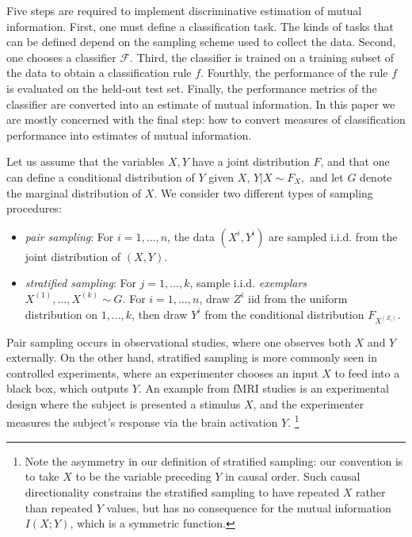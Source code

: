 \documentclass{article}
\begin{document}
Five steps are required to implement discriminative estimation of mutual information.
First, one must define a classification task.  The kinds of tasks that can be defined
depend on the sampling scheme used to collect the data.  Second,
one chooses a classifier $\mathcal{F}$.   Third, the classifier is trained on a training subset
of the data to obtain a classification rule $f$.  Fourthly, the performance of the rule $f$ is evaluated on the held-out test set.  Finally, the performance metrics of the classifier are converted into
an estimate of mutual information.  In this paper we are mostly concerned with the final step:
how to convert measures of classification performance into estimates of mutual information.

Let us assume that the variables $X, Y$ have a joint distribution $F$, and
that one can define a conditional distribution of $Y$ given $X$,
$Y|X \sim F_X,$
and let $G$ denote the marginal distribution of $X$.
We consider two different types of sampling procedures:
\begin{itemize}
\item \emph{pair sampling}:  For $i = 1,\hdots, n$, the data $(X^i, Y^i)$ are sampled i.i.d. from the joint distribution of $(X, Y)$.
\item \emph{stratified sampling}:  For $j = 1,\hdots, k$, sample i.i.d. \emph{exemplars} $X^{(1)},\hdots, X^{(k)} \sim G$.  For $i = 1,\hdots, n$, draw $Z^i$ iid from the uniform distribution on $1,\hdots, k$, then draw $Y^i$ from the conditional distribution $F_{X^{(Z_i)}}$.
\end{itemize}

Pair sampling occurs in observational studies, where one observes both $X$ and $Y$ externally.  On the other hand, stratified sampling is more commonly seen in controlled experiments, where an experimenter chooses an input $X$ to feed into a black box, which outputs $Y$.  An example from fMRI studies is an experimental design where the subject is presented a stimulus $X$, and the experimenter measures the subject's response via the brain activation $Y$. \footnote{Note the asymmetry in our definition of stratified sampling: our convention is to take $X$ to be the variable preceding $Y$ in causal order.  Such causal directionality constrains the stratified sampling to have repeated $X$ rather than repeated $Y$ values, but has no consequence for the mutual information $I(X; Y)$, which is a symmetric function.}
\end{document}
